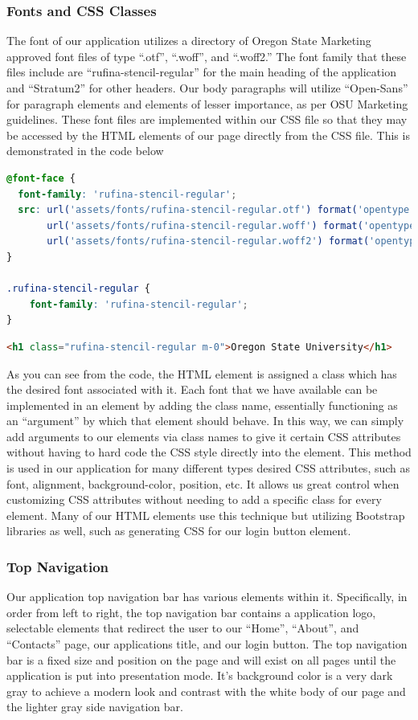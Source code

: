 \documentclass[letterpaper,10pt,serif,draftclsnofoot,onecolumn,compsoc,titlepage]{IEEEtran}
\begin{document}
	\subsubsection{Fonts and CSS Classes}
	The font of our application utilizes a directory of Oregon State Marketing approved font files of type ``.otf'', ``.woff'', and ``.woff2.'' The font family that 
	these files include are ``rufina-stencil-regular'' for the main heading of the application and ``Stratum2'' for other headers. Our body paragraphs will utilize ``Open-Sans''
	for paragraph elements and elements of lesser importance, as per OSU Marketing guidelines. These font files 
	are implemented within our CSS file so that they may be accessed by the HTML elements of our page directly from the CSS file. This is demonstrated in the code below
	
\begin{lstlisting}[caption={CSS Implementation} language=CSS]
@font-face {
  font-family: 'rufina-stencil-regular';
  src: url('assets/fonts/rufina-stencil-regular.otf') format('opentype'),
       url('assets/fonts/rufina-stencil-regular.woff') format('opentype'),
       url('assets/fonts/rufina-stencil-regular.woff2') format('opentype');
}

.rufina-stencil-regular {
	font-family: 'rufina-stencil-regular';
}
\end{lstlisting}
\begin{lstlisting}[caption={HTML Implementation} language=HTML]
<h1 class="rufina-stencil-regular m-0">Oregon State University</h1>
\end{lstlisting}

	As you can see from the code, the HTML element is assigned a class which has the desired font associated with it. Each font that we have available can be 
	implemented in an element by adding the class name, essentially functioning as an ``argument'' by which that element should behave. In this way, we can simply
	add arguments to our elements via class names to give it certain CSS attributes without having to hard code the CSS style directly into the element. This method is used in our application for many
	different types desired CSS attributes, such as font, alignment, background-color, position, etc. It allows us great control when customizing CSS attributes without 
	needing to add a specific class for every element. Many of our HTML elements use this technique but utilizing Bootstrap libraries as well, such as generating CSS for 
	our login button element. 
	\subsubsection{Top Navigation}
	Our application top navigation bar has various elements within it. Specifically, in order from left to right, the top navigation bar contains a application logo, 
	selectable elements that redirect the user to our ``Home'', ``About'', and ``Contacts'' page, our applications title, and our login button. The top navigation bar 
	is a fixed size and position on the page and will exist on all pages until the application is put into presentation mode. It's background color is a very dark gray to achieve
	a modern look and contrast with the white body of our page and the lighter gray side navigation bar. 
	
\end{document}
